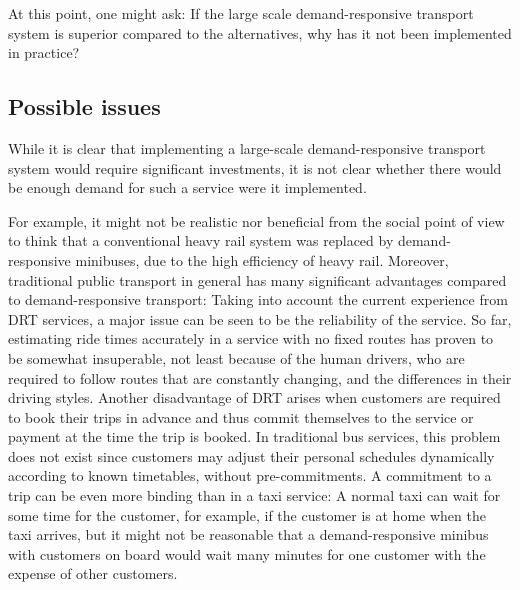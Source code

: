 \documentclass[dissertation,draft*]{aaltoseries}
\begin{document}
At this point, one might ask: If the large scale demand-responsive transport system is superior 
compared to the alternatives, why has it not been implemented in practice? 

\subsection{Possible issues} %
While it is clear that implementing a large-scale demand-responsive transport system 
would require significant investments, it is not clear 
whether there would be enough demand for such a service were it implemented. 

For example, it might not be realistic nor beneficial from the social point of view 
to think that a conventional heavy rail system was replaced by demand-responsive minibuses, 
due to the high efficiency of heavy rail.
Moreover, traditional public transport in general has many significant advantages compared to
demand-responsive transport: Taking into account the current experience from DRT services,
a major issue can be seen to be the reliability of the service. So far, estimating ride times accurately
in a service with no fixed routes has proven to be somewhat insuperable, not least because
of the human drivers, who are required to follow routes that are constantly changing, and the
differences in their driving styles. Another disadvantage of DRT arises when customers are 
required to book their trips in advance and thus commit themselves to the service or payment
at the time the trip is booked. In traditional bus services, this problem does not
exist since customers may adjust their personal schedules dynamically according to known timetables,
without pre-commitments. A commitment to a trip can be even more binding than in a taxi service:
A normal taxi can wait for some time for the customer, for example, if the customer is at home 
when the taxi arrives, but it might not be reasonable that a demand-responsive minibus with 
customers on board would wait many minutes for one customer with the expense of other customers.
\end{document}
